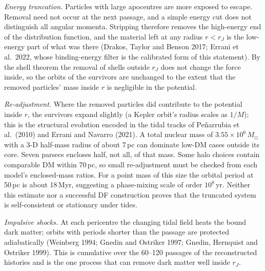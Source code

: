 \documentclass[11pt,a4paper]{article}
\begin{document}
\emph{Energy truncation.} Particles with large apocentres are more exposed to escape. Removal need not occur at
the next passage, and a simple energy cut does not distinguish all angular momenta. Stripping therefore removes the high-energy end of the distribution function, and the material left at any radius $r<r_J$ is the low-energy part of what was there (Drakos, Taylor and Benson 2017; Errani et al.\ 2022, whose binding-energy filter is the calibrated form of this statement). By the shell theorem the removal of shells outside $r_J$ does not change the force inside, so the orbits of the survivors are unchanged to the extent that the removed particles' mass inside $r$ is negligible in the potential.

\emph{Re-adjustment.} Where the removed particles did contribute to the potential inside $r$, the survivors expand slightly (a Kepler orbit's radius scales as $1/M$); this is the structural evolution encoded in the tidal tracks of Pe\~narrubia et al.\ (2010) and Errani and Navarro (2021). A total nuclear mass of $3.55\times10^6\,M_\odot$ with a 3-D half-mass radius of
about 7\,pc can dominate low-DM cases outside its core. Seven parsecs encloses half,
not all, of that mass. Some halo choices contain comparable DM within 70\,pc, so small
re-adjustment must be checked from each model's enclosed-mass ratios. For a point mass
of this size the orbital period at 50\,pc is about 18\,Myr, suggesting a phase-mixing
scale of order $10^8$\,yr. Neither this estimate nor a successful DF construction proves
that the truncated system is self-consistent or stationary under tides.

\emph{Impulsive shocks.} At each pericentre the changing tidal field heats the bound dark matter; orbits with periods shorter than the passage are protected adiabatically (Weinberg 1994; Gnedin and Ostriker 1997; Gnedin, Hernquist and Ostriker 1999). This is cumulative over the 60--120 passages of the reconstructed histories and is the one process that can remove dark matter well inside $r_J$.
\end{document}
